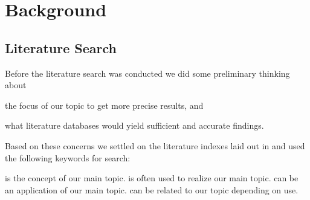\chapter{Background}
\label{chapter:background}

%
%
%
%
%
%
%

\section{Literature Search}
\label{section:literature.search}

Before the literature search was conducted we did some preliminary thinking
about
\begin{inparaenum}[(i)]
  \item the focus of our topic to get more precise results, and
  \item what literature databases would yield sufficient and accurate
    findings.
\end{inparaenum}
Based on these concerns we settled on the literature indexes laid out in
 and used the following keywords%
for search:

\begin{items}
   is the concept of our main topic.
   is often used to realize our
    main topic.
   can be an application of our main topic.
   can be related to our topic depending on use.
\end{items}

